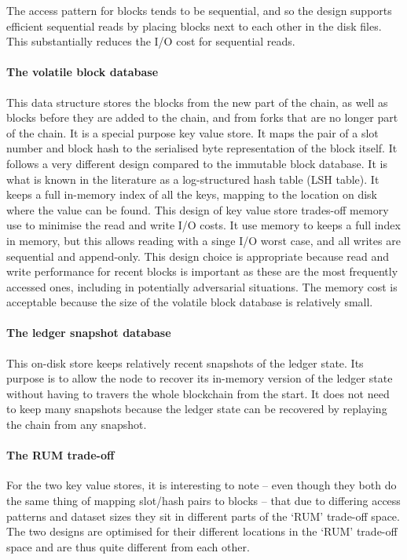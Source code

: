 \documentclass[11pt,a4paper]{article}
\begin{document}
The access pattern for blocks tends to be sequential, and so the design
supports efficient sequential reads by placing blocks next to each other in the
disk files. This substantially reduces the I/O cost for sequential reads.

\paragraph{The volatile block database}
This data structure stores the blocks from the new part of the chain, as well
as blocks before they are added to the chain, and from forks that are no longer
part of the chain. It is a special purpose key value store. It maps the pair of
a slot number and block hash to the serialised byte representation of the block
itself. It follows a very different design compared to the immutable block
database. It is what is known in the literature as a log-structured hash table
(LSH table). It keeps a full in-memory index of all the keys, mapping to the
location on disk where the value can be found. This design of key value store
trades-off memory use to minimise the read and write I/O costs. It use memory
to keeps a full index in memory, but this allows reading with a singe I/O worst
case, and all writes are sequential and append-only. This design choice is
appropriate because read and write performance for recent blocks is important
as these are the most frequently accessed ones, including in potentially
adversarial situations. The memory cost is acceptable because the size of the
volatile block database is relatively small.

\paragraph{The ledger snapshot database}
This on-disk store keeps relatively recent snapshots of the ledger state. Its
purpose is to allow the node to recover its in-memory version of the ledger
state without having to travers the whole blockchain from the start. It does
not need to keep many snapshots because the ledger state can be recovered by
replaying the chain from any snapshot.

\paragraph{The RUM trade-off}
For the two key value stores, it is interesting to note -- even though they
both do the same thing of mapping slot/hash pairs to blocks -- that due to
differing access patterns and dataset sizes they sit in different parts of the
`RUM' trade-off space. The two designs are optimised for their different
locations in the `RUM' trade-off space and are thus quite different from each
other.
\end{document}
